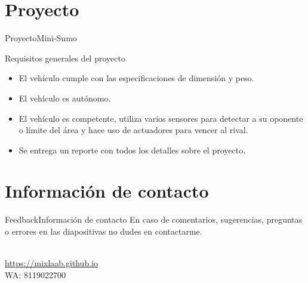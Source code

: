 \documentclass[10pt]{beamer}
\newcommand{\chref}[2]{%
  \href{#1}{{\usebeamercolor[bg]{Aalborg}#2}}%
}
\begin{document}
\section{Proyecto}
\begin{frame}{Proyecto}{Mini-Sumo}
\begin{block}{Requisitos generales del proyecto}
    \begin{itemize}
        \item El vehículo cumple con las especificaciones de dimensión y peso.
        \item El vehículo es autónomo.
        \item El vehículo es competente, utiliza varios sensores para detectar a su oponente o límite del área y hace uso de actuadores para vencer al rival. 
        \item Se entrega un reporte con todos los detalles sobre el proyecto.
    \end{itemize}
\end{block}

\end{frame}

\section{Información de contacto}
\begin{frame}{Feedback}{Información de contacto}
En caso de comentarios, sugerencias, preguntas o errores en las diapositivas no dudes en contactarme.
  \begin{center}
    \insertauthor\\
    \chref{https://mixlaab.github.io}{https://mixlaab.github.io}\\
    WA: 8119022700\\
  \end{center}
\end{frame}

{\aauwavesbg%
\begin{frame}%
\end{frame}}
\end{document}
